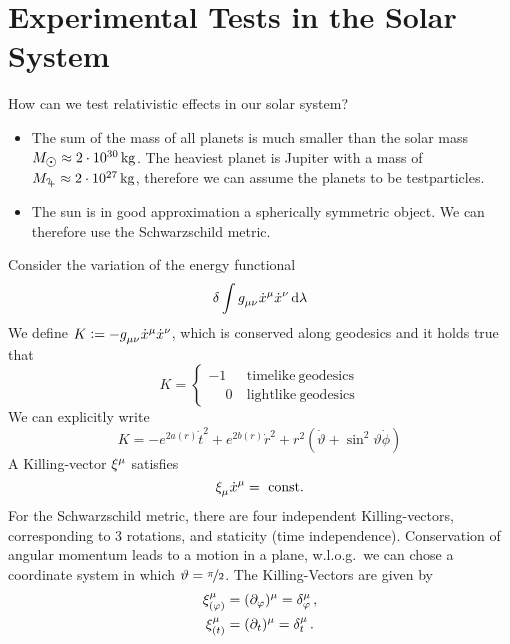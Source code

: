 \chapter{Experimental Tests in the Solar System}
How can we test relativistic effects in our solar system?
\begin{itemize}
  \item The sum of the mass of all planets is much smaller than the solar mass
  $M_{\astrosun}\approx \unit[2\cdot 10^{30}]{kg}$. The heaviest planet is
  Jupiter with a mass of $M_{\jupiter}\approx \unit[2\cdot 10^{27}]{kg}$,
  therefore we can assume the planets to be testparticles.
  \item The sun is in good approximation a spherically symmetric object. We can
  therefore use the Schwarzschild metric.
\end{itemize}
Consider the variation of the energy functional 
\begin{equation}
\delta
\int\tensor{g}{_\mu_\nu}\tensor{\dot{x}}{^\mu}\tensor{\dot{x}}{^\nu}\dif\lambda
\end{equation}
We define
$K:=-\tensor{g}{_\mu_\nu}\tensor{\dot{x}}{^\mu}\tensor{\dot{x}}{^\nu}$, which is
conserved along geodesics and it holds true that
\begin{equation}
K=\begin{cases}
-1& \mathrm{\ timelike\ geodesics}\\
\phantom{-}0& \mathrm{\ lightlike\ geodesics}
\end{cases}
\end{equation}
We can explicitly write
\begin{equation}
K=-e^{2a(r)}\dot{t}^2+e^{2b(r)}\dot{r}^2+r^2\left(\dot{\vartheta}+\sin^2\vartheta
\dot{\phi}\right)
\end{equation}
A Killing-vector $\tensor{\xi}{^\mu}$ satisfies
\begin{equation}
\tensor{\xi}{_\mu}\tensor{\dot{x}}{^\mu}=\mathrm{\ const.}
\end{equation}
For the Schwarzschild metric, there are four independent Killing-vectors,
corresponding to 3 rotations, and staticity (time independence).
Conservation of angular momentum leads to a motion in a plane, w.l.o.g.\ we can
chose a coordinate system in which $\vartheta=\nicefrac{\pi}{2}$.
The Killing-Vectors are given by
\begin{align}
\tensor*{\xi}{_{(\varphi)}^\mu}&=(\partial_\varphi)^\mu=\tensor*{\delta}{_\varphi^\mu}\,,\\
\tensor*{\xi}{_{(t)}^\mu}&=(\partial_t)^\mu=\tensor*{\delta}{_t^\mu}\,.
\end{align}
